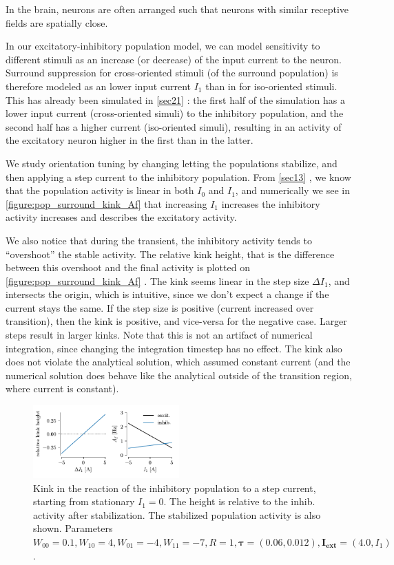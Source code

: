 \documentclass[10pt,conference,compsocconf,a4paper]{IEEEtran}
\renewcommand{\vec}[1]{\boldsymbol{#1}}
\newcommand*{\shortautoref}[1]{%
	\begingroup
	\def\equationautorefname{\textsc{Eq.}}%
	\def\tableautorefname{\textsc{Tab.}}%
	\def\figureautorefname{\textsc{Fig.}}%
	\autoref{#1}%
	\endgroup
}
\begin{document}
		In the brain, neurons are often arranged such that neurons with similar receptive fields are spatially close.

		In our excitatory-inhibitory population model, we can model sensitivity to different stimuli as an increase (or decrease) of the input current to the neuron. Surround suppression for cross-oriented stimuli (of the surround population) is therefore modeled as an lower input current $I_1$ than in for iso-oriented stimuli. This has already been simulated in \shortautoref{sec21} : the first half of the simulation has a lower input current (cross-oriented simuli) to the inhibitory population, and the second half has a higher current (iso-oriented simuli), resulting in an activity of the excitatory neuron higher in the first than in the latter.

		We study orientation tuning by changing letting the populations stabilize, and then applying a step current to the inhibitory population. From \shortautoref{sec13}, we know that the population activity is linear in both $I_0$ and $I_1$, and numerically we see in \shortautoref{figure:pop_surround_kink_Af} that increasing $I_1$ increases the inhibitory activity increases and describes the excitatory activity.

		We also notice that during the transient, the inhibitory activity tends to ``overshoot'' the stable activity. The relative kink height, that is the difference between this overshoot and the final activity is plotted on \shortautoref{figure:pop_surround_kink_Af}. The kink seems linear in the step size $\Delta I_1$, and intersects the origin, which is intuitive, since we don't expect a change if the current stays the same. If the step size is positive (current increased over transition), then the kink is positive, and vice-versa for the negative case. Larger steps result in larger kinks. Note that this is not an artifact of numerical integration, since changing the integration timestep has no effect. The kink also does not violate the analytical solution, which assumed constant current (and the numerical solution does behave like the analytical outside of the transition region, where current is constant).

		\begin{figure}
			\centering
			\includegraphics[width=0.5\textwidth]{figures/pop_surround_kink_Af.pdf}
			\caption{Kink in the reaction of the inhibitory population to a step current, starting from stationary $I_1 = 0$. The height is relative to the inhib. activity after stabilization. The stabilized population activity is also shown. Parameters $W_{00} = 0.1, W_{10} = 4, W_{01} = -4, W_{11} = -7, R = 1, \vec \tau = (0.06, 0.012), \vec{I_{\text{ext}}} = (4.0, I_1)$.}
			\label{figure:pop_surround_kink_Af}
		\end{figure}
\end{document}
